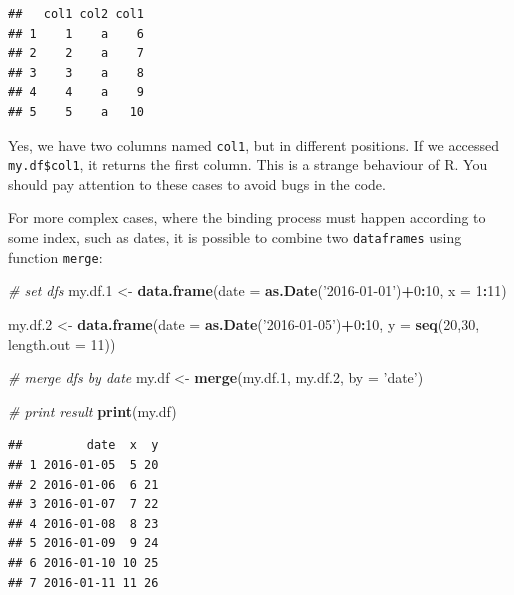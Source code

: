 \documentclass[11pt,]{book}
\newenvironment{Shaded}{\begin{snugshade}}{\end{snugshade}}
\newcommand{\KeywordTok}[1]{\textcolor[rgb]{0.27,0.27,0.27}{\textbf{#1}}}
\newcommand{\DataTypeTok}[1]{\textcolor[rgb]{0.27,0.27,0.27}{#1}}
\newcommand{\DecValTok}[1]{\textcolor[rgb]{0.06,0.06,0.06}{#1}}
\newcommand{\StringTok}[1]{\textcolor[rgb]{0.5,0.5,0.5}{#1}}
\newcommand{\CommentTok}[1]{\textcolor[rgb]{0.56,0.35,0.01}{\textit{#1}}}
\newcommand{\OperatorTok}[1]{\textcolor[rgb]{0.81,0.36,0.00}{\textbf{#1}}}
\newcommand{\NormalTok}[1]{#1}
\begin{document}
\begin{verbatim}
##   col1 col2 col1
## 1    1    a    6
## 2    2    a    7
## 3    3    a    8
## 4    4    a    9
## 5    5    a   10
\end{verbatim}

Yes, we have two columns named \texttt{col1}, but in different
positions. If we accessed \texttt{my.df\$col1}, it returns the first
column. This is a strange behaviour of R. You should pay attention to
these cases to avoid bugs in the code.

For more complex cases, where the binding process must happen according
to some index, such as dates, it is possible to combine two
\texttt{dataframes} using function \texttt{merge}: 

\begin{Shaded}
\begin{Highlighting}[]
\CommentTok{# set dfs}
\NormalTok{my.df.}\DecValTok{1}\NormalTok{ <-}\StringTok{ }\KeywordTok{data.frame}\NormalTok{(}\DataTypeTok{date =} \KeywordTok{as.Date}\NormalTok{(}\StringTok{'2016-01-01'}\NormalTok{)}\OperatorTok{+}\DecValTok{0}\OperatorTok{:}\DecValTok{10}\NormalTok{, }
                      \DataTypeTok{x =} \DecValTok{1}\OperatorTok{:}\DecValTok{11}\NormalTok{)}

\NormalTok{my.df.}\DecValTok{2}\NormalTok{ <-}\StringTok{ }\KeywordTok{data.frame}\NormalTok{(}\DataTypeTok{date =} \KeywordTok{as.Date}\NormalTok{(}\StringTok{'2016-01-05'}\NormalTok{)}\OperatorTok{+}\DecValTok{0}\OperatorTok{:}\DecValTok{10}\NormalTok{,}
                      \DataTypeTok{y =} \KeywordTok{seq}\NormalTok{(}\DecValTok{20}\NormalTok{,}\DecValTok{30}\NormalTok{, }\DataTypeTok{length.out =} \DecValTok{11}\NormalTok{))}

\CommentTok{# merge dfs by date                   }
\NormalTok{my.df <-}\StringTok{ }\KeywordTok{merge}\NormalTok{(my.df.}\DecValTok{1}\NormalTok{, my.df.}\DecValTok{2}\NormalTok{, }\DataTypeTok{by =} \StringTok{'date'}\NormalTok{)}

\CommentTok{# print result}
\KeywordTok{print}\NormalTok{(my.df)}
\end{Highlighting}
\end{Shaded}

\begin{verbatim}
##         date  x  y
## 1 2016-01-05  5 20
## 2 2016-01-06  6 21
## 3 2016-01-07  7 22
## 4 2016-01-08  8 23
## 5 2016-01-09  9 24
## 6 2016-01-10 10 25
## 7 2016-01-11 11 26
\end{verbatim}
\end{document}
